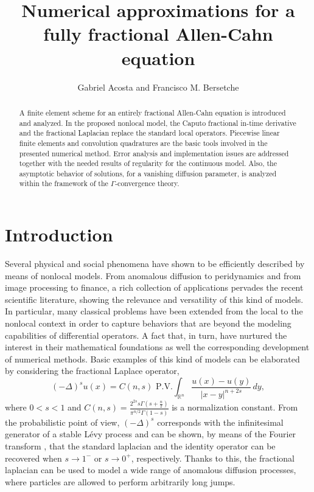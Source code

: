 \documentclass{amsart}
\title[Numerical approximations for a fully fractional
Allen-Cahn equation]{Numerical approximations for a fully fractional Allen-Cahn equation}
\author[G. Acosta and F. M. Bersetche ]{Gabriel Acosta and Francisco M. Bersetche}
\newcommand{\rn}{{\mathbb{R}^n}}
\theoremstyle{remark}
\theoremstyle{definition}
\numberwithin{equation}{section}
\begin{document}
\begin{abstract}

A finite element scheme for an entirely fractional Allen-Cahn equation is introduced and analyzed. In the proposed nonlocal model, the Caputo fractional in-time derivative  and the fractional Laplacian replace the standard local operators. Piecewise linear finite elements and convolution quadratures are the basic 
tools involved in the presented numerical method.  Error analysis and implementation issues  are addressed together with the needed results of regularity for the continuous model. Also, the asymptotic behavior of solutions, for a vanishing  diffusion parameter, is analyzed within the framework of the $\Gamma$-convergence theory.

\end{abstract}

\maketitle

\section{Introduction}
Several physical and social phenomena  have shown to be efficiently described by means of  nonlocal models. From anomalous diffusion to peridynamics and from image processing to finance,  a rich collection of applications pervades 
the recent scientific literature, showing the relevance and versatility of this kind of models. In particular, many classical problems have been extended from the local to the nonlocal context in order to capture behaviors that are beyond the modeling capabilities of differential operators.  
A fact that, in turn, have nurtured the interest in their mathematical foundations as well the corresponding development of numerical methods. 
Basic examples of this kind of models can be elaborated by considering  the fractional Laplace operator,
 \begin{equation}
(-\Delta)^s u (x) = C(n,s) \mbox{ P.V.} \int_\rn \frac{u(x)-u(y)}{|x-y|^{n+2s}} \, dy,
\label{eq:fraccionario}
\end{equation}
where $0<s<1$ and $ C(n,s) = \frac{2^{2s} s \Gamma(s+\frac{n}{2})}{\pi^{n/2} \Gamma(1-s)} $ is a normalization constant. 
From the probabilistic point of view, $(-\Delta)^s $ corresponds with the infinitesimal generator of a stable L\'evy process and can be shown, by means of the Fourier transform \cite{Hitchhikers}, that  the standard laplacian and the identity operator can be recovered  when $s\to 1^{-}$ or $s\to 0^{+}$, respectively.  Thanks to this, the fractional laplacian can be used to model a wide range of anomalous diffusion processes, where  particles are allowed to perform arbitrarily long jumps. 
\end{document}
